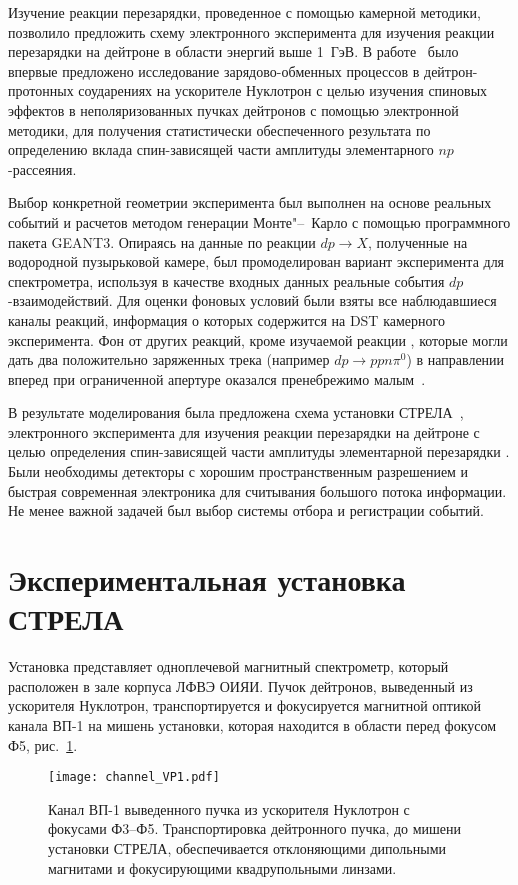 Изучение реакции перезарядки, проведенное с помощью камерной методики, позволило
предложить схему электронного эксперимента для изучения реакции перезарядки на
дейтроне в области энергий выше 1~ГэВ. В работе~\cite{glagolev96} было впервые
предложено исследование зарядово-обменных процессов в дейтрон-протонных
соударениях на ускорителе Нуклотрон с целью изучения спиновых эффектов в
неполяризованных пучках дейтронов с помощью электронной методики, для получения
статистически обеспеченного результата по определению вклада спин-зависящей
части амплитуды элементарного $np$-рассеяния.

Выбор конкретной геометрии эксперимента был выполнен на основе реальных событий
и расчетов методом генерации Монте"--~Карло с помощью программного пакета
GEANT3. Опираясь на данные по реакции $dp \rightarrow X$, полученные на
водородной пузырьковой камере, был промоделирован вариант эксперимента для
спектрометра, используя в качестве входных данных реальные события
$dp$-взаимодействий.  Для оценки фоновых условий были взяты все наблюдавшиеся
каналы реакций, информация о которых содержится на DST камерного
эксперимента. Фон от других реакций, кроме изучаемой реакции \dpfrag, которые
могли дать два положительно заряженных трека (например $dp \rightarrow
ppn\pi^{0}$) в направлении вперед при ограниченной апертуре оказался
пренебрежимо малым~\cite{baz99}.

В результате моделирования была предложена схема установки
СТРЕЛА~\cite{strela_web}, электронного эксперимента для изучения реакции
перезарядки на дейтроне \dpchex с целью определения спин-зависящей части
амплитуды элементарной перезарядки \np. Были необходимы детекторы с хорошим
пространственным разрешением и быстрая современная электроника для считывания
большого потока информации. Не менее важной задачей был выбор системы отбора и
регистрации событий.

\section{Экспериментальная установка СТРЕЛА}
Установка представляет одноплечевой магнитный спектрометр, который расположен в
зале корпуса  ЛФВЭ ОИЯИ. Пучок дейтронов, выведенный из ускорителя
Нуклотрон, транспортируется и фокусируется магнитной оптикой канала ВП-1 на
мишень установки, которая находится в области перед фокусом Ф5,
рис.~\ref{fig:channel_VP1}.

\begin{figure}[h]
  \centering
  \texttt{[image: channel\_VP1.pdf]}
  \caption{Канал ВП-1 выведенного пучка из ускорителя Нуклотрон с фокусами
    Ф3--Ф5. Транспортировка дейтронного пучка, до мишени установки СТРЕЛА,
    обеспечивается отклоняющими дипольными магнитами и фокусирующими
    квадрупольными линзами.}
  \label{fig:channel_VP1}
\end{figure}

